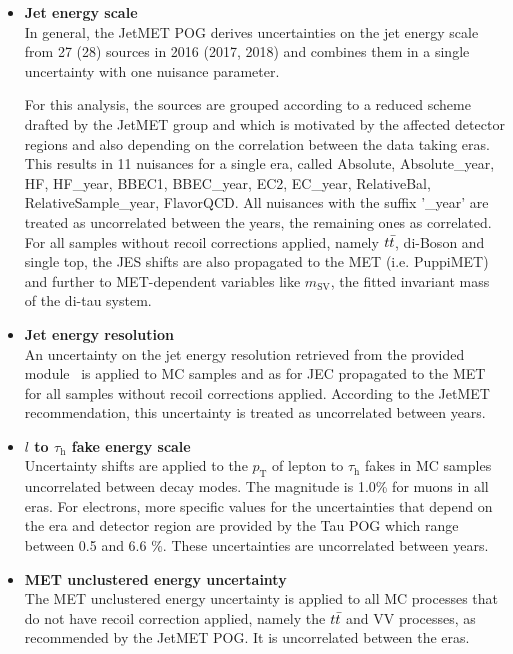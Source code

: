 \begin{itemize}
\item \textbf{Jet energy scale}\\
In general, the JetMET POG derives uncertainties on the jet energy scale from 27 (28) sources in 2016 (2017, 2018) and combines them in a single uncertainty with one nuisance parameter.

For this analysis, the sources are grouped according to a reduced scheme drafted by the JetMET group and which is motivated by the affected detector regions and also depending on the correlation between the data taking eras.
This results in 11 nuisances for a single era, called Absolute, Absolute\_year, HF, HF\_year, BBEC1, BBEC\_year, EC2, EC\_year, RelativeBal, RelativeSample\_year, FlavorQCD.
All nuisances with the suffix '\_year' are treated as uncorrelated between the years, the remaining ones as correlated.
For all samples without recoil corrections applied, namely $t\bar{t}$, di-Boson and single top, the JES shifts are also propagated to the MET (i.e. PuppiMET) and further to
MET-dependent variables like $m_\mathrm{SV}$, the fitted invariant mass of the di-tau system.

\item \textbf{Jet energy resolution}\\
An uncertainty on the jet energy resolution retrieved from the provided module~\cite{JetResolution} is applied to MC samples and as for JEC propagated to the MET for all samples without recoil corrections applied.
According to the JetMET recommendation, this uncertainty is treated as uncorrelated between years.

\item {\bf $l$ to $\tau_\mathrm{h}$ fake energy scale} \\
Uncertainty shifts are applied to the $p_\mathrm{T}$ of lepton to $\tau_\mathrm{h}$ fakes in MC samples uncorrelated between decay modes.
The magnitude is 1.0\% for muons in all eras.
For electrons, more specific values for the uncertainties that depend on the era and detector region are provided by the Tau POG which range between 0.5 and 6.6 \%.
These uncertainties are uncorrelated between years.

\item {\bf MET unclustered energy uncertainty} \\
The MET unclustered energy uncertainty is applied to all MC processes that do not have recoil correction applied, namely the $t\bar{t}$ and VV processes, as recommended by the JetMET POG.
It is uncorrelated between the eras.


\end{itemize}
